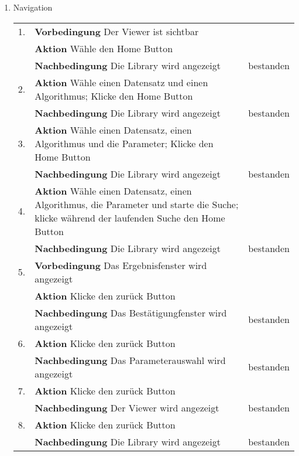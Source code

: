 \begin{enumerate} [label=\bfseries /TS \arabic*0/, leftmargin=*]
	\newpage
	\item Navigation \newline \newline
	\begin{tabular}{rp{4in}|l}
	1. & \textbf{Vorbedingung} Der Viewer ist sichtbar & \\
	   & \textbf{Aktion} Wähle den Home Button & \\
	   & \textbf{Nachbedingung} Die Library wird angezeigt & bestanden \\
	\hline
	2. & \textbf{Aktion} Wähle einen Datensatz und einen Algorithmus; Klicke den Home Button & \\
	   & \textbf{Nachbedingung} Die Library wird angezeigt & bestanden \\
	\hline
	3. & \textbf{Aktion} Wähle einen Datensatz, einen Algorithmus und die Parameter; Klicke den Home Button & \\
	   & \textbf{Nachbedingung} Die Library wird angezeigt & bestanden \\
	\hline
	4. & \textbf{Aktion} Wähle einen Datensatz, einen Algorithmus, die Parameter und starte die Suche; klicke während der laufenden Suche den Home Button & \\
	   & \textbf{Nachbedingung} Die Library wird angezeigt & bestanden \\
	\hline
	5. & \textbf{Vorbedingung} Das Ergebnisfenster wird angezeigt & \\
	   & \textbf{Aktion} Klicke den zurück Button & \\
	   & \textbf{Nachbedingung} Das Bestätigungfenster wird angezeigt & bestanden \\
	\hline
	6. & \textbf{Aktion} Klicke den zurück Button & \\
	   & \textbf{Nachbedingung} Das Parameterauswahl wird angezeigt & bestanden \\
	\hline
	7. & \textbf{Aktion} Klicke den zurück Button & \\
	   & \textbf{Nachbedingung} Der Viewer wird angezeigt & bestanden \\
	\hline
	8. & \textbf{Aktion} Klicke den zurück Button & \\
	   & \textbf{Nachbedingung} Die Library wird angezeigt & bestanden \\
	\end{tabular}

\end{enumerate}

\newpage

